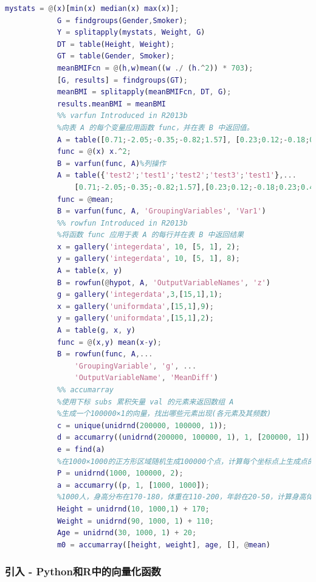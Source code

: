 \begin{lstlisting}[language=Matlab]
            mystats = @(x)[min(x) median(x) max(x)];
            G = findgroups(Gender,Smoker);
            Y = splitapply(mystats, Weight, G)
            DT = table(Height, Weight);
            GT = table(Gender, Smoker);
            meanBMIFcn = @(h,w)mean((w ./ (h.^2)) * 703);
            [G, results] = findgroups(GT);
            meanBMI = splitapply(meanBMIFcn, DT, G);
            results.meanBMI = meanBMI
            %% varfun Introduced in R2013b
            %向表 A 的每个变量应用函数 func，并在表 B 中返回值。
            A = table([0.71;-2.05;-0.35;-0.82;1.57], [0.23;0.12;-0.18;0.23;0.41])
            func = @(x) x.^2;
            B = varfun(func, A)%列操作
            A = table({'test2';'test1';'test2';'test3';'test1'},...
                [0.71;-2.05;-0.35;-0.82;1.57],[0.23;0.12;-0.18;0.23;0.41])
            func = @mean;
            B = varfun(func, A, 'GroupingVariables', 'Var1')
            %% rowfun Introduced in R2013b
            %将函数 func 应用于表 A 的每行并在表 B 中返回结果
            x = gallery('integerdata', 10, [5, 1], 2);
            y = gallery('integerdata', 10, [5, 1], 8);
            A = table(x, y)
            B = rowfun(@hypot, A, 'OutputVariableNames', 'z')
            g = gallery('integerdata',3,[15,1],1);
            x = gallery('uniformdata',[15,1],9);
            y = gallery('uniformdata',[15,1],2);
            A = table(g, x, y)
            func = @(x,y) mean(x-y);
            B = rowfun(func, A,...
                'GroupingVariable', 'g', ...
                'OutputVariableName', 'MeanDiff')
            %% accumarray
            %使用下标 subs 累积矢量 val 的元素来返回数组 A
            %生成一个100000×1的向量，找出哪些元素出现(各元素及其频数)
            c = unique(unidrnd(200000, 100000, 1));
            d = accumarry((unidrnd(200000, 100000, 1), 1, [200000, 1]);
            e = find(a)
            %在1000×1000的正方形区域随机生成100000个点，计算每个坐标点上生成点的个数
            P = unidrnd(1000, 100000, 2);
            a = accumarry((p, 1, [1000, 1000]);
            %1000人，身高分布在170-180，体重在110-200，年龄在20-50，计算身高体重相同的人的平均年龄
            Height = unidrnd(10, 1000,1) + 170;
            Weight = unidrnd(90, 1000, 1) + 110;
            Age = unidrnd(30, 1000, 1) + 20;
            m0 = accumarray([height, weight], age, [], @mean)
                \end{lstlisting}
        \subsubsection{引入 - Python和R中的向量化函数}
            \par
